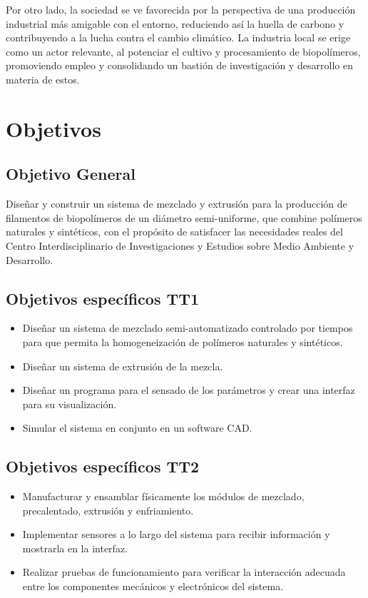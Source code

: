 \documentclass[14pt,oneside]{extarticle} %
\begin{document}
Por otro lado, la sociedad se ve favorecida por la perspectiva de una producción industrial más amigable con el entorno, reduciendo así la huella de carbono y contribuyendo a la lucha contra el cambio climático. La industria local se erige como un actor relevante, al potenciar el cultivo y procesamiento de biopolímeros, promoviendo empleo y consolidando un bastión de investigación y desarrollo en materia de estos.

\section{Objetivos}

\subsection{Objetivo General}

Diseñar y construir un sistema de mezclado y extrusión para la producción de filamentos de biopolímeros de un diámetro semi-uniforme, que combine polímeros naturales y sintéticos, con el propósito de satisfacer las necesidades reales del Centro Interdisciplinario de Investigaciones y Estudios sobre Medio Ambiente y Desarrollo.

\subsection{Objetivos específicos TT1}

\begin{itemize}
    \item Diseñar un sistema de mezclado semi-automatizado controlado por tiempos para que permita la homogeneización de polímeros naturales y sintéticos.
    \item Diseñar un sistema de extrusión de la mezcla.
    \item Diseñar un programa para el sensado de los parámetros y crear una interfaz para su visualización.
    \item Simular el sistema en conjunto en un software CAD.
\end{itemize}

\subsection{Objetivos específicos TT2}

\begin{itemize}
    \item Manufacturar y ensamblar físicamente los módulos de mezclado, precalentado, extrusión y enfriamiento.
    \item Implementar sensores a lo largo del sistema para recibir información y mostrarla en la interfaz.
    \item Realizar pruebas de funcionamiento para verificar la interacción adecuada entre los componentes mecánicos y electrónicos del sistema.
\end{itemize}
\end{document}
